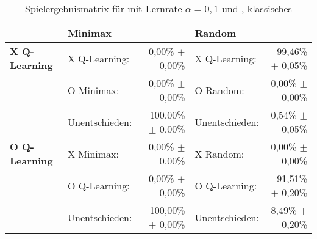 \begin{table}
\centering
\caption[Spielergebnismatrix Q-Learning: $\alpha=0,1$, \wtable, klassisches \splay]{Spielergebnismatrix für \qlearning mit Lernrate $\alpha=0,1$ und \wtable, klassisches \splay}
\label{tab:resultmatrix_ql_normal_alpha01_afterstate}

\begin{tabular}{llrlr}
\toprule
 & \multicolumn{2}{l}{\textbf{Minimax}} & \multicolumn{2}{l}{\textbf{Random}} \\ \midrule
\textbf{X Q-Learning}   & X Q-Learning:     & 0,00\% $\pm$    0,00\%            & X Q-Learning:         & 99,46\% $\pm$ 0,05\%  \\
                        & O Minimax:        & 0,00\% $\pm$    0,00\%            & O Random:            & 0,00\% $\pm$ 0,00\%  \\
                        & Unentschieden:    & 100,00\% $\pm$  0,00\%            & Unentschieden:        & 0,54\% $\pm$ 0,05\%  \\ \cmidrule{2-5}
\textbf{O Q-Learning}   & X Minimax:        & 0,00\% $\pm$    0,00\%            & X Random:             & 0,00\% $\pm$ 0,00\%  \\
                        & O Q-Learning:     & 0,00\% $\pm$    0,00\%            & O Q-Learning:         & 91,51\% $\pm$ 0,20\%  \\
                        & Unentschieden:    & 100,00\% $\pm$  0,00\%            & Unentschieden:        & 8,49\% $\pm$ 0,20\%  \\ \bottomrule
\end{tabular}
\end{table}